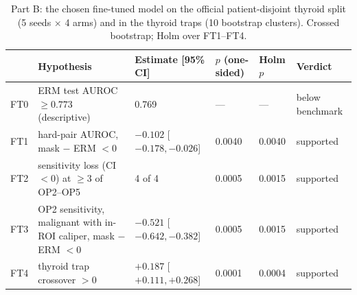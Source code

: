 \begin{table}[H]\centering\scriptsize
\caption{Part B: the chosen fine-tuned model on the official patient-disjoint thyroid split (5 seeds $\times$ 4 arms) and in the thyroid traps (10 bootstrap clusters). Crossed bootstrap; Holm over FT1--FT4.}\label{tab:ft}
\begin{tabular}{lp{5.4cm}p{3.0cm}p{1.3cm}p{1.1cm}p{1.9cm}}\toprule
 & Hypothesis & Estimate [95\% CI] & $p$ (one-sided) & Holm $p$ & Verdict \\\midrule
FT0 & ERM test AUROC $\ge0.773$ (descriptive) & 0.769 & --- & --- & below benchmark \\
FT1 & hard-pair AUROC, mask $-$ ERM $<0$ & $-0.102$ [$-0.178, -0.026$] & 0.0040 & 0.0040 & supported \\
FT2 & sensitivity loss (CI $<0$) at $\ge3$ of OP2--OP5 & 4 of 4 & 0.0005 & 0.0015 & supported \\
FT3 & OP2 sensitivity, malignant with in-ROI caliper, mask $-$ ERM $<0$ & $-0.521$ [$-0.642, -0.382$] & 0.0005 & 0.0015 & supported \\
FT4 & thyroid trap crossover $>0$ & $+0.187$ [$+0.111, +0.268$] & 0.0001 & 0.0004 & supported \\
\bottomrule\end{tabular}
\end{table}
